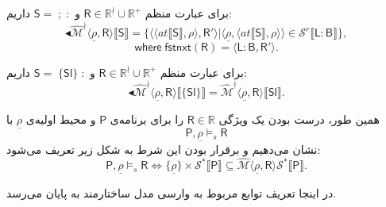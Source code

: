 برای عبارت منظم 
$\mathsf{R} \in \mathbb{R}^\nmid \cup \mathbb{R^+}$
و 
$\mathsf{S= \; ; \;:}$
داریم:
$$\blacktriangleleft\mathcal{\hat{M}^\nmid}  \langle \underline{\rho}, \mathsf{R} \rangle \llbracket \mathsf{S} \rrbracket = \{\langle \langle at \llbracket \mathsf{S} \rrbracket , \rho \rangle , \mathsf{R'} \rangle | \langle \underline{\rho}, \langle at \llbracket \mathsf{S} \rrbracket , \rho \rangle \rangle \in \mathcal{S}^r \llbracket \mathsf{L:B}\rrbracket\},$$
$$\mathsf{where \; fstnxt (R) = \langle L:B,R' \rangle}.$$
	
	

برای عبارت منظم 
$\mathsf{R} \in \mathbb{R}^\nmid \cup \mathbb{R^+}$
و 
$\mathsf{S= \; \{Sl\} \;:}$
داریم:
$$\blacktriangleleft \mathcal{\hat{M}^\nmid} \langle \underline{\rho}, \mathsf{R} \rangle \llbracket \{\mathsf{Sl}\} \rrbracket =
 \mathcal{\hat{M}^\nmid} \langle \underline{\rho}, \mathsf{R} \rangle \llbracket \mathsf{Sl} \rrbracket.$$


همین طور، درست بودن یک ویژگی $\mathsf{R} \in \mathbb{R}$ را برای برنامه‌ی $\mathsf{P}$ و محیط اولیه‌ی $\underline{\rho}$ با 
$$\mathsf{P} , \underline{\rho} \models_s \mathsf{R}$$
نشان می‌دهیم و برقرار بودن این شرط به شکل زیر تعریف می‌شود:
$$\mathsf{P} , \underline{\rho} \models_s \mathsf{R} \iff \{\underline{\rho}\} \times \mathcal{S}^* \llbracket \mathsf{P} \rrbracket \subseteq \hat{\mathcal{M}} \langle \underline{\rho} , \mathsf{R} \rangle \mathcal{S}^* \llbracket \mathsf{P} \rrbracket.$$

در اینجا تعریف توابع مربوط به وارسی مدل ساختارمند به پایان می‌رسد.

 
 
 
 
 